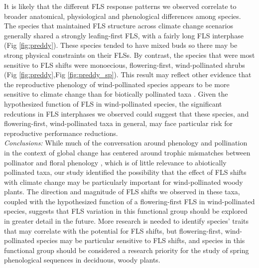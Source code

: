 \documentclass[11pt]{article}\usepackage[]{graphicx}\usepackage[]{color}
\begin{document}
\noindent It is likely that the different FLS response patterns we observed correlate to broader anatomical, physiological and phenological differences among species. The species that maintained FLS structure across climate change scenarios generally shared a strongly leafing-first FLS, with a fairly long FLS interphase (Fig \ref{fig:preddy}). These species tended to have mixed buds so there may be strong physical constraints on their FLSs. By contrast, the species that were most sensitive to FLS shifts were monoecious, flowering-first, wind-pollinated shrubs (Fig \ref{fig:preddy},Fig \ref{fig:preddy_sp}). This result may reflect other evidence that the reproductive phenology of wind-pollinated species appears to be more sensitive to climate change than for biotically pollinated taxa \citep{Ziello:2012aa}. Given the hypothesized function of FLS in wind-pollinated species, the significant redcutions in FLS interphases we observed could suggest that these species, and flowering-first, wind-pollinated taxa in general, may face particular risk for reproductive performance reductions.\\

\noindent \emph{Conclusions:} While much of the conversation around phenology and pollination in the context of global change has centered around trophic mismatches between pollinator and floral phenology \citep{Memmott2007}, which is of little relevance to abiotically pollinated taxa, our study identified the possibility that the effect of FLS shifts with climate change may be particularly important for wind-pollinated woody plants. The direction and magnitude of FLS shifts we observed in these taxa, coupled with the hypothesized function of a flowering-first FLS in wind-pollinated species, suggests that FLS variation in this functional group should be explored in greater detail in the future. More research is needed to identify species' traits that may correlate with the potential for FLS shifts, but flowering-first, wind-pollinated species may be particular sensitive to FLS shifts, and species in this functional group should be considered a research priority for the study of spring phenological sequences in deciduous, woody plants.\\ 


 
\end{document}

